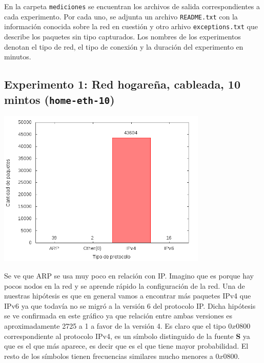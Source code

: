 En la carpeta \texttt{mediciones} se encuentran los archivos de salida correspondientes a cada
experimento. Por cada uno, se adjunta un archivo \texttt{README.txt} con la información conocida
sobre la red en cuestión y otro arhivo \texttt{exceptions.txt} que describe los paquetes sin tipo
capturados. Los nombres de los experimentos denotan el tipo de red, el tipo de conexión y la
duración del experimento en minutos.

\subsection{Experimento 1: Red hogareña, cableada, 10 mintos (\texttt{home-eth-10})}

\includegraphics[width=10cm]{../mediciones/home-eth-10/home-eth-10Protocolos.png}

Se ve que ARP se usa muy poco en relación con IP. Imagino que es porque hay pocos nodos en la red y se aprende rápido la configuración de la red.
Una de nuestras hipótesis es que en general vamos a encontrar más paquetes IPv4 que IPv6 ya que todavía no se migró a la versión 6 del protocolo IP.
Dicha hipótesis se ve confirmada en este gráfico ya que relación entre ambas versiones es aproximadamente 2725 a 1 a favor de la versión 4.
Es claro que el tipo $0x0800$ correspondiente al protocolo IPv4, es un símbolo distinguido de la fuente \textbf{S} ya que es el que más aparece,
es decir que es el que tiene mayor probabilidad. El resto de los símbolos tienen frecuencias similares mucho menores a $0x0800$.

